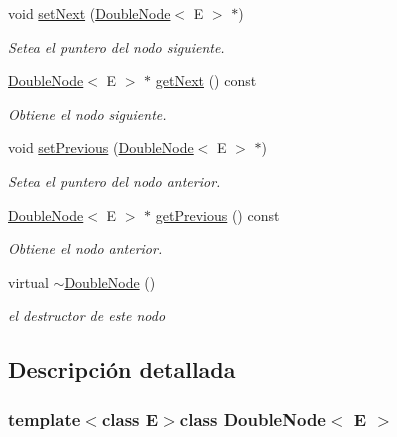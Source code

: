\begin{DoxyCompactItemize}
\item 
void \hyperlink{classDoubleNode_aba52422e27040e524ba629445e9d8b93}{set\-Next} (\hyperlink{classDoubleNode}{Double\-Node}$<$ E $>$ $\ast$)
\begin{DoxyCompactList}\small\item\em Setea el puntero del nodo siguiente. \end{DoxyCompactList}\item 
\hyperlink{classDoubleNode}{Double\-Node}$<$ E $>$ $\ast$ \hyperlink{classDoubleNode_af5af4a30419b7a7c746361c1476e119f}{get\-Next} () const 
\begin{DoxyCompactList}\small\item\em Obtiene el nodo siguiente. \end{DoxyCompactList}\item 
void \hyperlink{classDoubleNode_aa76c202fdfd533984d9e9ae1892d194d}{set\-Previous} (\hyperlink{classDoubleNode}{Double\-Node}$<$ E $>$ $\ast$)
\begin{DoxyCompactList}\small\item\em Setea el puntero del nodo anterior. \end{DoxyCompactList}\item 
\hyperlink{classDoubleNode}{Double\-Node}$<$ E $>$ $\ast$ \hyperlink{classDoubleNode_a86c75b7ed7e944f9748363fe23b2518e}{get\-Previous} () const 
\begin{DoxyCompactList}\small\item\em Obtiene el nodo anterior. \end{DoxyCompactList}\item 
\hypertarget{classDoubleNode_abd78f421a570cd0fb0cecfedb979d799}{virtual \hyperlink{classDoubleNode_abd78f421a570cd0fb0cecfedb979d799}{$\sim$\-Double\-Node} ()}\label{classDoubleNode_abd78f421a570cd0fb0cecfedb979d799}

\begin{DoxyCompactList}\small\item\em el destructor de este nodo \end{DoxyCompactList}\end{DoxyCompactItemize}


\subsection{Descripción detallada}
\subsubsection*{template$<$class E$>$class Double\-Node$<$ E $>$}

